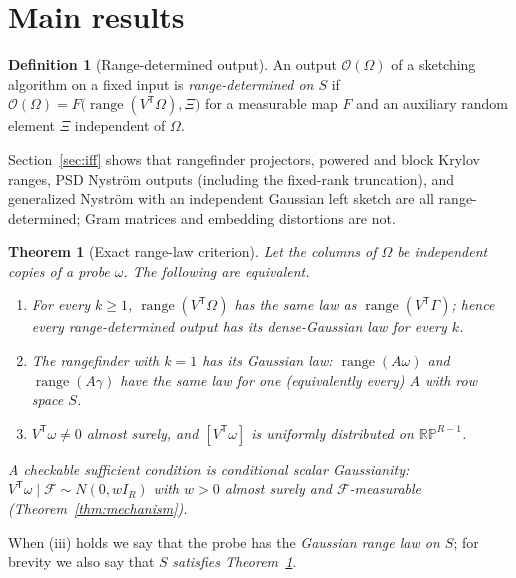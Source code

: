 \documentclass[11pt,a4paper]{article}
\newtheorem{mainthm}{Theorem}
\theoremstyle{definition}
\newtheorem{definition}[theorem]{Definition}
\theoremstyle{remark}
\numberwithin{equation}{section}
\newcommand{\T}{{\mathsf T}}
\newcommand{\range}{\operatorname{range}}
\newcommand{\RP}{\mathbb{RP}}
\begin{document}
\section{Main results}\label{sec:main}

\begin{definition}[Range-determined output]\label{def:rangedet}
An output $\mathcal O(\Omega)$ of a sketching algorithm on a fixed input is
\emph{range-determined on $S$} if
$\mathcal O(\Omega)=F\bigl(\range(V^\T\Omega),\Xi\bigr)$ for a measurable
map $F$ and an auxiliary random element $\Xi$ independent of $\Omega$.
\end{definition}

Section~\ref{sec:iff} shows that rangefinder projectors, powered and block
Krylov ranges, PSD Nystr\"om outputs (including the fixed-rank truncation), and
generalized Nystr\"om with an independent Gaussian left sketch are all
range-determined; Gram matrices and embedding distortions are not.

\begin{mainthm}[Exact range-law criterion]\label{mthm:iff}
Let the columns of $\Omega$ be independent copies of a probe $\omega$.
The following are equivalent.
\begin{enumerate}[label=\textup{(\roman*)}]
\item For every $k\ge1$, $\range(V^\T\Omega)$ has the same law as
      $\range(V^\T\Gamma)$; hence every range-determined output has its
      dense-Gaussian law for every $k$.
\item The rangefinder with $k=1$ has its Gaussian law: $\range(A\omega)$ and
      $\range(A\gamma)$ have the same law for one (equivalently every) $A$
      with row space $S$.
\item $V^\T\omega\ne0$ almost surely, and $[V^\T\omega]$ is uniformly
      distributed on $\RP^{R-1}$.
\end{enumerate}
A checkable sufficient condition is conditional scalar Gaussianity:
$V^\T\omega\mid\mathcal F\sim N(0,wI_R)$ with $w>0$ almost surely and
$\mathcal F$-measurable (Theorem~\ref{thm:mechanism}).
\end{mainthm}

When (iii) holds we say that the probe has the \emph{Gaussian range law on
$S$}; for brevity we also say that $S$ \emph{satisfies
Theorem~\ref{mthm:iff}}.
\end{document}
